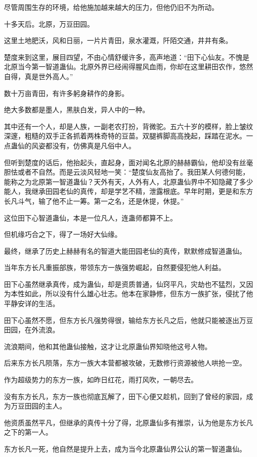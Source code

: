 \begin{this_body}
尽管周围生存的环境，给他施加越来越大的压力，但他仍旧不为所动。

十多天后。北原，万豆田园。

这里土地肥沃，风和日丽，一片片青田，泉水灌溉，阡陌交通，井井有条。

楚度来到这里，展目四望，不由心情舒缓许多，高声地道：“田下心仙友。不愧是北原当今第一智道蛊仙。北原外界已经闹得腥风血雨，你却在这里耕田农作，悠然自得，真是世外高人。”

数十万亩青田，有许多躬身耕作的身影。

绝大多数都是墨人，黑肤白发，异人中的一种。

其中还有一个人，却是人族，一副老农打扮，背微驼。五六十岁的模样，脸上皱纹深邃，粗糙的双手正各抓着两株奇特的豆苗。双腿裤脚高高挽起，踩踏在泥水。一点蛊仙的风姿都没有，仿佛真是凡俗中人。

但听到楚度的话后，他抬起头，直起身，面对闻名北原的赫赫霸仙，他却没有丝毫胆怯或者不自然。而是云淡风轻地一笑：“楚度仙友高抬了。我田某人何德何能，能称之为北原第一智道蛊仙？天外有天，人外有人，北原蛊仙界中不知隐藏了多少能人，我继承田园老仙的真传，却是学艺不精，泄露根底。早年时期，更是和东方长凡斗气，输了他不止一筹。第一之名，还是休提，休提。”

这位田下心智道蛊仙，本是一位凡人，连蛊师都算不上。

但机缘巧合之下，得了一场好大仙缘。

最终，继承了历史上赫赫有名的智道大能田园老仙的真传，默默修成智道蛊仙。

当年东方长凡重振部族，带领东方一族强势崛起，自然要侵犯他人利益。

田下心虽然继承真传，成为蛊仙，却是资质普通，仙窍平凡，灾劫也不猛烈，又因为本性如此，所以没有什么雄心壮志。他本在家静修，但东方一族扩张，侵扰了他平静安详的生活。

田下心虽然不愿，但东方长凡强势得很，输给东方长凡之后，他就只能被逐出万豆田园，在外流浪。

流浪期间，他和其他蛊仙接触，这才让北原蛊仙界知晓他这号人物。

后来东方长凡陨落，东方一族大本营都被攻破，无数修行资源被他人哄抢一空。

作为超级势力的东方一族，如昨日红花，雨打风吹，一朝尽去。

没有东方长凡，东方一族也彻底瓦解了，田下心便又趁机，回到了曾经的家园，成为万豆田园的主人。

他资质虽然平凡，但继承的真传十分了得，北原蛊仙多有推崇，认为他是东方长凡之下的第一人。

东方长凡一死，他自然是提升上去，成为当今北原蛊仙界公认的第一智道蛊仙。


\end{this_body}
